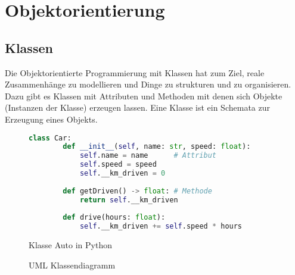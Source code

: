 \section{Objektorientierung}
\subsection{Klassen}

Die Objektorientierte Programmierung mit Klassen hat zum Ziel,
reale Zusammenhänge zu modellieren und Dinge zu strukturen und
zu organisieren. Dazu gibt es Klassen mit Attributen und Methoden
mit denen sich Objekte (Instanzen der Klasse) erzeugen lassen.
Eine Klasse ist ein Schemata zur Erzeugung eines Objekts.


\vspace*{0.5cm}
\begin{figure}[H]
\begin{center}
\hspace*{-2cm}
\begin{minipage}{.7\textwidth}
    \begin{lstlisting}[language=python]
    class Car:
        def __init__(self, name: str, speed: float):
            self.name = name      # Attribut
            self.speed = speed
            self.__km_driven = 0
            
        def getDriven() -> float: # Methode
            return self.__km_driven
            
        def drive(hours: float):
            self.__km_driven += self.speed * hours
    \end{lstlisting}
    \caption{Klasse Auto in Python}
\end{minipage}
\begin{minipage}{.3\textwidth}
    \caption{UML Klassendiagramm}
\end{minipage}
\end{center}
\end{figure}

